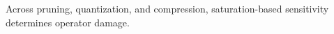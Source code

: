 Across pruning, quantization, and compression, saturation-based
sensitivity determines operator damage.
